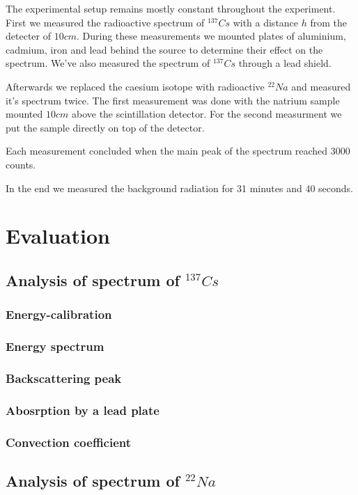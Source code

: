 \documentclass[bigchapter,colorback,accentcolor=tud4b,linedtoc,11pt]{tudreport}
\begin{document}
The experimental setup remains mostly constant throughout the experiment. First
we measured the radioactive spectrum of $^{137}Cs$ with a distance $h$ from the
detecter of $10 cm$. During these measurements
we mounted plates of aluminium, cadmium, iron and lead behind the source to
determine their effect on the spectrum. We've also measured the spectrum of
$^{137}Cs$ through a lead shield.

Afterwards we replaced the caesium isotope with radioactive $^{22}Na$ and
measured it's spectrum twice. The first measurement was done with the natrium
sample mounted $10 cm$ above the scintillation detector. For the second
measurment we put the sample directly on top of the detector.

Each measurement concluded when the main peak of the spectrum reached $3000$ counts.

In the end we measured the background radiation for 31 minutes and 40 seconds.

\chapter{Evaluation}
\section{Analysis of spectrum of $^{137}Cs$}
\subsection{Energy-calibration}
\subsection{Energy spectrum}
\subsection{Backscattering peak}
\subsection{Abosrption by a lead plate}
\subsection{Convection coefficient}

\section{Analysis of spectrum of $^{22}Na$}
\end{document}

